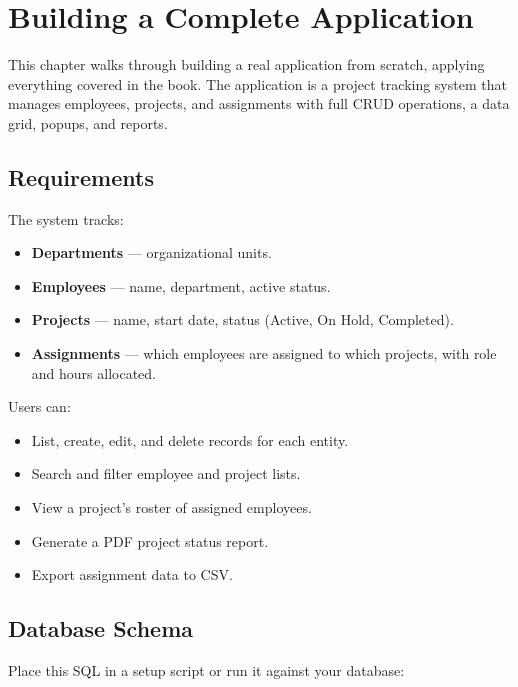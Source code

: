 \chapter{Building a Complete Application}
\label{ch:complete-app}

This chapter walks through building a real application from scratch, applying everything covered in the book.  The application is a project tracking system that manages employees, projects, and assignments with full CRUD operations, a data grid, popups, and reports.

\section{Requirements}
\label{sec:app-requirements}

The system tracks:

\begin{itemize}
  \item \textbf{Departments} --- organizational units.
  \item \textbf{Employees} --- name, department, active status.
  \item \textbf{Projects} --- name, start date, status (Active, On Hold, Completed).
  \item \textbf{Assignments} --- which employees are assigned to which projects, with role and hours allocated.
\end{itemize}

\noindent
Users can:
\begin{itemize}
  \item List, create, edit, and delete records for each entity.
  \item Search and filter employee and project lists.
  \item View a project's roster of assigned employees.
  \item Generate a PDF project status report.
  \item Export assignment data to CSV.
\end{itemize}

\section{Database Schema}
\label{sec:app-schema}

Place this SQL in a setup script or run it against your database:

